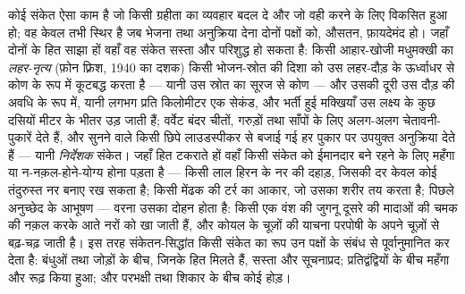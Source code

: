 \begin{proposition}[ईमानदार संकेत]\label{prop:b3:behavioural-ecology:signals}
कोई संकेत ऐसा काम है जो किसी ग्रहीता का व्यवहार बदल दे और जो वही करने
के लिए विकसित हुआ हो; वह केवल तभी स्थिर है जब भेजना तथा अनुक्रिया देना
दोनों पक्षों को, औसतन, फ़ायदेमंद हो। जहाँ दोनों के हित साझा हों वहाँ वह
संकेत सस्ता और परिशुद्ध हो सकता है: किसी आहार-खोजी मधुमक्खी का
\emph{लहर-नृत्य} (फ़ोन फ़्रिश, 1940 का दशक) किसी भोजन-स्रोत की दिशा को
उस लहर-दौड़ के ऊर्ध्वाधर से कोण के रूप में कूटबद्ध करता है --- यानी उस
स्रोत का सूरज से कोण --- और उसकी दूरी उस दौड़ की अवधि के रूप में, यानी
लगभग प्रति किलोमीटर एक सेकंड, और भर्ती हुई मक्खियाँ उस लक्ष्य के कुछ
दसियों मीटर के भीतर उड़ जाती हैं; वर्वेट बंदर चीतों, गरुड़ों तथा साँपों
के लिए अलग-अलग चेतावनी-पुकारें देते हैं, और सुनने वाले किसी छिपे
लाउडस्पीकर से बजाई गई हर पुकार पर उपयुक्त अनुक्रिया देते हैं --- यानी
\emph{निर्देशक} संकेत। जहाँ हित टकराते हों वहाँ किसी संकेत को ईमानदार
बने रहने के लिए महँगा या न-नक़ल-होने-योग्य होना पड़ता है --- किसी लाल
हिरन के नर की दहाड़, जिसकी दर केवल कोई तंदुरुस्त नर बनाए रख सकता है;
किसी मेंढक की टर्र का आकार, जो उसका शरीर तय करता है; पिछले अनुच्छेद के
आभूषण --- वरना उसका दोहन होता है: किसी एक वंश की जुगनू दूसरे की मादाओं
की चमक की नक़ल करके आते नरों को खा जाती हैं, और कोयल के चूज़ों की
याचना परपोषी के अपने चूज़ों से बढ़-चढ़ जाती है। इस तरह संकेतन-सिद्धांत
किसी संकेत का रूप उन पक्षों के संबंध से पूर्वानुमानित कर देता है: बंधुओं
तथा जोड़ों के बीच, जिनके हित मिलते हैं, सस्ता और सूचनाप्रद;
प्रतिद्वंद्वियों के बीच महँगा और रूढ़ किया हुआ; और परभक्षी तथा शिकार के
बीच कोई होड़।
\end{proposition}
\admitted

